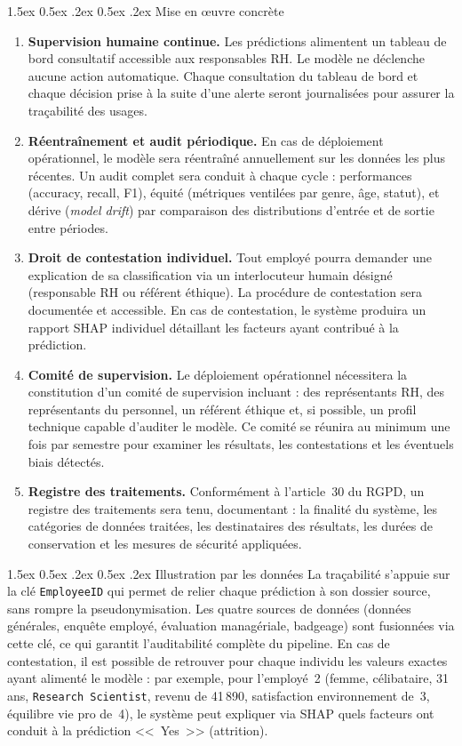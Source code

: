 \documentclass[12pt,a4paper]{article}
\makeatletter
\renewcommand\paragraph{\@startsection{paragraph}{4}{\z@}%
  {1.5ex \@plus 0.5ex \@minus .2ex}%
  {0.5ex \@plus .2ex}%
  {\normalfont\normalsize\bfseries}}
\makeatother
\begin{document}
\paragraph{Mise en \oe uvre concrète}
\begin{enumerate}
    \item \textbf{Supervision humaine continue.} Les prédictions alimentent un tableau de bord consultatif accessible aux responsables RH. Le modèle ne déclenche aucune action automatique. Chaque consultation du tableau de bord et chaque décision prise à la suite d'une alerte seront journalisées pour assurer la traçabilité des usages.
    \item \textbf{Réentraînement et audit périodique.} En cas de déploiement opérationnel, le modèle sera réentraîné annuellement sur les données les plus récentes. Un audit complet sera conduit à chaque cycle : performances (accuracy, recall, F1), équité (métriques ventilées par genre, âge, statut), et dérive (\textit{model drift}) par comparaison des distributions d'entrée et de sortie entre périodes.
    \item \textbf{Droit de contestation individuel.} Tout employé pourra demander une explication de sa classification via un interlocuteur humain désigné (responsable RH ou référent éthique). La procédure de contestation sera documentée et accessible. En cas de contestation, le système produira un rapport SHAP individuel détaillant les facteurs ayant contribué à la prédiction.
    \item \textbf{Comité de supervision.} Le déploiement opérationnel nécessitera la constitution d'un comité de supervision incluant : des représentants RH, des représentants du personnel, un référent éthique et, si possible, un profil technique capable d'auditer le modèle. Ce comité se réunira au minimum une fois par semestre pour examiner les résultats, les contestations et les éventuels biais détectés.
    \item \textbf{Registre des traitements.} Conformément à l'article~30 du RGPD, un registre des traitements sera tenu, documentant : la finalité du système, les catégories de données traitées, les destinataires des résultats, les durées de conservation et les mesures de sécurité appliquées.
\end{enumerate}

\paragraph{Illustration par les données}
La traçabilité s'appuie sur la clé \texttt{EmployeeID} qui permet de relier chaque prédiction à son dossier source, sans rompre la pseudonymisation. Les quatre sources de données (données générales, enquête employé, évaluation managériale, badgeage) sont fusionnées via cette clé, ce qui garantit l'auditabilité complète du pipeline. En cas de contestation, il est possible de retrouver pour chaque individu les valeurs exactes ayant alimenté le modèle : par exemple, pour l'employé~2 (femme, célibataire, 31 ans, \texttt{Research Scientist}, revenu de 41\,890, satisfaction environnement de~3, équilibre vie pro de~4), le système peut expliquer via SHAP quels facteurs ont conduit à la prédiction <<~Yes~>> (attrition).
\end{document}
